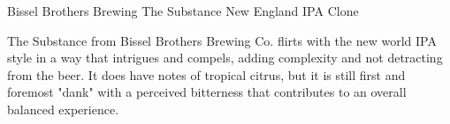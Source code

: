 \begin{recipie}{Bissel Brothers Brewing The Substance New England IPA Clone}

\begin{aboutblock}
The Substance from Bissel Brothers Brewing Co. flirts with the new world IPA style
in a way that intrigues and compels, adding complexity and not detracting from the
beer. It does have notes of tropical citrus, but it is still first and foremost
"dank" with a perceived bitterness that contributes to an overall balanced experience.
\sourceaha
\end{aboutblock}


\begin{methodandtiming}
 
\begin{mashsteps}
\end{mashsteps}

\begin{fermentationsteps}
\end{fermentationsteps}

\end{methodandtiming}

\pagebreak

\begin{ingredientsblock}

\begin{malts}
\end{malts}

\begin{hops}

\end{hops}


\end{ingredientsblock}

\end{recipie}

